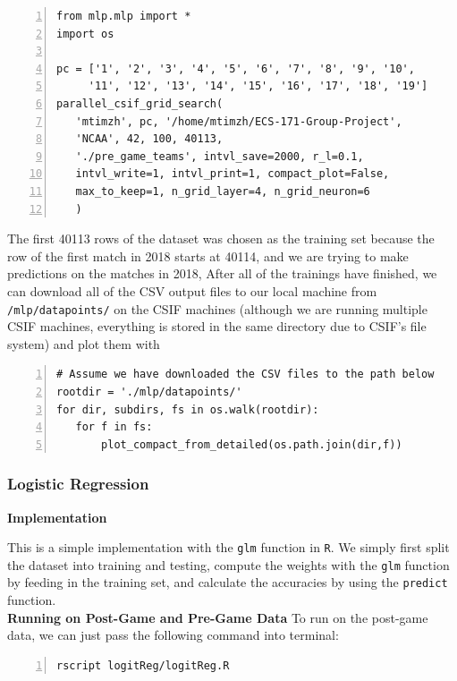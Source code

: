 \documentclass[12pt]{article}
\begin{document}
\lstset{language=Python, upquote=true}
\begin{lstlisting}[basicstyle=\small, numbers=left]
from mlp.mlp import *
import os

pc = ['1', '2', '3', '4', '5', '6', '7', '8', '9', '10',
     '11', '12', '13', '14', '15', '16', '17', '18', '19']
parallel_csif_grid_search(
   'mtimzh', pc, '/home/mtimzh/ECS-171-Group-Project',
   'NCAA', 42, 100, 40113,
   './pre_game_teams', intvl_save=2000, r_l=0.1,
   intvl_write=1, intvl_print=1, compact_plot=False,
   max_to_keep=1, n_grid_layer=4, n_grid_neuron=6
   )
\end{lstlisting}

\quad The first 40113 rows of the dataset was chosen as the training set because the row of the first match in 2018 starts at 40114, and we are trying to make predictions on the matches in 2018, After all of the trainings have finished, we can download all of the CSV output files to our local machine from \texttt{/mlp/datapoints/} on the CSIF machines  (although we are running multiple CSIF machines, everything is stored in the same directory due to CSIF's file system)  and plot them with 

\lstset{language=Python, upquote=true}
\begin{lstlisting}[basicstyle=\small, numbers=left]
# Assume we have downloaded the CSV files to the path below
rootdir = './mlp/datapoints/'
for dir, subdirs, fs in os.walk(rootdir):
   for f in fs:
       plot_compact_from_detailed(os.path.join(dir,f))
\end{lstlisting}


\subsubsection{Logistic Regression}

\textbf{Implementation}

\quad This is a simple implementation with the \texttt{glm} function in \texttt{R}. We simply first split the dataset into training and testing, compute the weights with the \texttt{glm} function by feeding in the training set, and calculate the accuracies by using the \texttt{predict} function. \\

\textbf{Running on Post-Game and Pre-Game Data}
To run on the post-game data, we can just pass the following command into terminal:
\lstset{upquote=true}
\begin{lstlisting}[basicstyle=\small, numbers=left]
rscript logitReg/logitReg.R 
\end{lstlisting}
\end{document}
